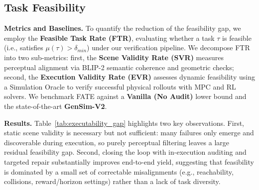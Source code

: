 \documentclass{article}
\theoremstyle{plain}
\theoremstyle{definition}
\theoremstyle{remark}
\begin{document}
\subsection{Task Feasibility}
\label{sec:exp_executability}
\textbf{Metrics and Baselines.}
To quantify the reduction of the feasibility gap, we employ the \textbf{Feasible Task Rate (FTR)}, evaluating whether a task $\tau$ is feasible (i.e., satisfies $\mu(\tau) > \delta_{min}$) under our verification pipeline. We decompose FTR into two sub-metrics: first, the \textbf{Scene Validity Rate (SVR)} measures perceptual alignment via BLIP-2 semantic coherence and geometric checks; second, the \textbf{Execution Validity Rate (EVR)} assesses dynamic feasibility using a Simulation Oracle to verify successful physical rollouts with MPC and RL solvers. We benchmark FATE against a \textbf{Vanilla (No Audit)} lower bound and the state-of-the-art \textbf{GenSim-V2}.
\begin{table}[h]
\centering
\caption{\textbf{Quantifying the Feasibility Gap.} We compare the validity of tasks generated by the vanilla baseline against FATE. We decompose the total yield (FTR) into static Scene Validity (SVR) and dynamic Execution Validity (EVR). }
\label{tab:executability_gap}
\end{table}
\textbf{Results.} Table~\ref{tab:executability_gap} highlights two key observations. First, static scene validity is necessary but not sufficient: many failures only emerge and discoverable during execution, so purely perceptual filtering leaves a large residual feasibility gap. Second, closing the loop with in-execution auditing and targeted repair substantially improves end-to-end yield, suggesting that feasibility is dominated by a small set of correctable misalignments (e.g., reachability, collisions, reward/horizon settings) rather than a lack of task diversity.
\end{document}
